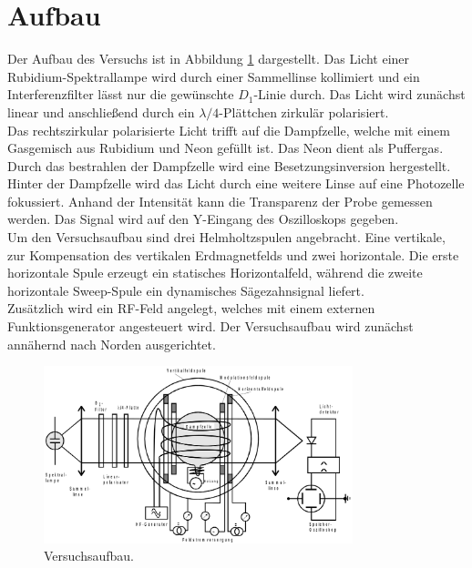 \section{Aufbau}
\label{sec:Aufbau}

Der Aufbau des Versuchs ist in Abbildung \ref{fig:aufbau} dargestellt. Das Licht einer Rubidium-Spektrallampe wird durch einer Sammellinse kollimiert und ein Interferenzfilter lässt nur die gewünschte $D_1$-Linie durch. Das Licht wird zunächst linear und anschließend durch ein $\lambda/4$-Plättchen zirkulär polarisiert.\\
Das rechtszirkular polarisierte Licht trifft auf die Dampfzelle, welche mit einem Gasgemisch aus Rubidium und Neon gefüllt ist. Das Neon dient als Puffergas. Durch das bestrahlen der Dampfzelle wird eine Besetzungsinversion hergestellt.\\
Hinter der Dampfzelle wird das Licht durch eine weitere Linse auf eine Photozelle fokussiert. Anhand der Intensität kann die Transparenz der Probe gemessen werden. Das Signal wird auf den Y-Eingang des Oszilloskops gegeben.\\
Um den Versuchsaufbau sind drei Helmholtzspulen angebracht. Eine vertikale, zur Kompensation des vertikalen Erdmagnetfelds und zwei horizontale. Die erste horizontale Spule erzeugt ein statisches Horizontalfeld, während die zweite horizontale Sweep-Spule ein dynamisches Sägezahnsignal liefert.\\
Zusätzlich wird ein RF-Feld angelegt, welches mit einem externen Funktionsgenerator angesteuert wird. Der Versuchsaufbau wird zunächst annähernd nach Norden ausgerichtet.

\begin{figure}
\centering
\includegraphics[keepaspectratio,width=0.8\textwidth]{content/images/aufbau.png}
\caption{Versuchsaufbau.}
\label{fig:aufbau}
\end{figure}